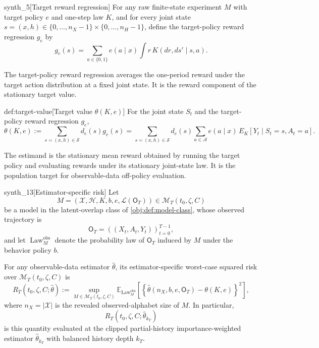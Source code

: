 \documentclass[11pt]{article}
\begin{document}
\begin{definitionv}{synth_5}[Target reward regression]
For any raw finite-state experiment \(M\) with target policy \(e\) and one-step law \(K\), and for every joint state \(s=(x,h)\in \{0,\ldots,n_X-1\}\times\{0,\ldots,n_H-1\}\), define the target-policy reward regression \(g_e\) by
\[
g_e(s)
=
\sum_{a\in\{0,1\}} e(a\mid x)\int r\,K(d r,d s'\mid s,a).
\]
\end{definitionv}

The target-policy reward regression  averages the one-period reward under the target action distribution at a fixed joint state. It is the reward component of the stationary target value.

\begin{definitionv}{def:target-value}[Target value \(\theta(K,e)\)]
For the joint state \(S_t\) and the target-policy reward regression \(g_e\),
\[
\theta(K,e)
:=
\sum_{s=(x,h)\in\mathcal S} d_e(s)g_e(s)
=
\sum_{s=(x,h)\in\mathcal S} d_e(s)
\sum_{a\in\mathcal A}
e(a\mid x)\,E_K[Y_t\mid S_t=s,A_t=a].
\]
\end{definitionv}

The estimand  is the stationary mean reward obtained by running the target policy and evaluating rewards under its stationary joint-state law. It is the population target for observable-data off-policy evaluation.

\begin{definitionv}{synth_13}[Estimator-specific risk]
Let
\[
M=(\mathcal X,\mathcal H,K,b,e,\mathcal L(\mathsf O_T))
\in \mathcal M_T(t_0,\zeta,C)
\]
be a model in the latent-overlap class of \cref{obj:def:model-class}, whose observed trajectory is
\[
\mathsf O_T=((X_t,A_t,Y_t))_{t=0}^{T-1},
\]
and let \(\operatorname{Law}^{\mathrm{obs}}_M\) denote the probability law of \(\mathsf O_T\) induced by \(M\) under the behavior policy \(b\).

For any observable-data estimator \(\widehat\theta\), its estimator-specific worst-case squared risk over \(\mathcal M_T(t_0,\zeta,C)\) is
\[
R_T(t_0,\zeta,C;\widehat\theta)
:=
\sup_{M\in\mathcal M_T(t_0,\zeta,C)}
\mathbb E_{\operatorname{Law}^{\mathrm{obs}}_M}
\!\left[
\left\{\widehat\theta(n_X,b,e,\mathsf O_T)-\theta(K,e)\right\}^2
\right],
\]
where \(n_X=|\mathcal X|\) is the revealed observed-alphabet size of \(M\). In particular,
\[
R_T(t_0,\zeta,C;\widehat\theta_{k_T})
\]
is this quantity evaluated at the clipped partial-history importance-weighted estimator \(\widehat\theta_{k_T}\) with balanced history depth \(k_T\).
\end{definitionv}
\end{document}
